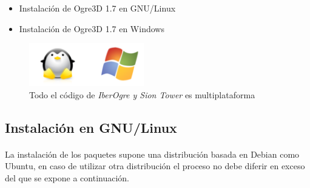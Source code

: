 \documentclass[16pt,spanish]{article}
\def \proyecto{\emph {IberOgre y Sion Tower} }
\begin{document}
\begin{itemize}
    \item Instalación de Ogre3D 1.7 en GNU/Linux
    \item Instalación de Ogre3D 1.7 en Windows
\end{itemize}

\begin{figure}[H]
    \centering
        \includegraphics[width=5cm]{img/linux-windows.png} 
    \caption{Todo el código de \proyecto es multiplataforma}
    \label{img:linux-windows}
\end{figure}

\subsection{Instalación en GNU/Linux}

\paragraph{}
La instalación de los paquetes supone una distribución basada en Debian
como Ubuntu, en caso de utilizar otra distribución el proceso no debe
diferir en exceso del que se expone a continuación.
\end{document}

